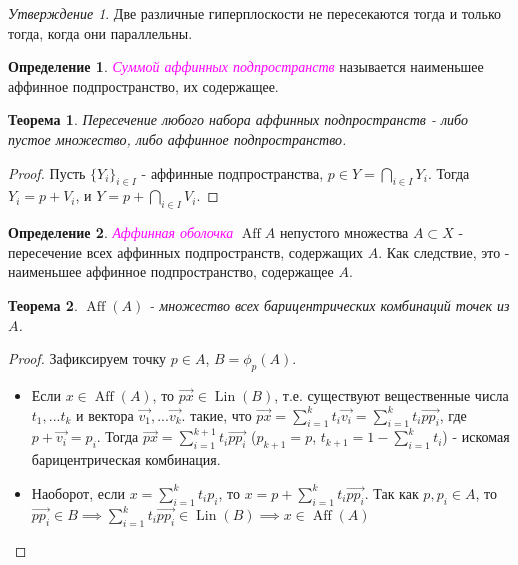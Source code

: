 \documentclass[a4paper,100pt]{article}
\theoremstyle{indented}
\newtheorem{theorem}{Теорема}
\theoremstyle{definition}
\newtheorem{defn}{Определение}
\theoremstyle{remark}
\newtheorem{stat}{Утверждение}
\DeclareMathOperator{\Aff}{Aff}
\DeclareMathOperator{\Lin}{Lin}
\begin{document}
\begin{stat}
    Две различные гиперплоскости не пересекаются тогда и только тогда, когда они параллельны.
\end{stat}

\begin{defn}
    \textit{\textcolor{magenta}{\hypertarget{s20}{Суммой аффинных подпространств}}} называется наименьшее аффинное подпространство, их содержащее.
\end{defn}

\begin{theorem}
    Пересечение любого набора аффинных подпространств - либо пустое множество, либо аффинное подпространство.
\end{theorem}

\begin{proof}
    Пусть $\{Y_i\}_{i \in I}$ - аффинные подпространства, $p \in Y=\bigcap_{i \in I} Y_i$. Тогда $Y_i=p+V_i$, и $Y=p+\bigcap_{i \in I}  V_i$. 
\end{proof}

\begin{defn}
    \textit{\textcolor{magenta}{\hypertarget{s21}{Аффинная оболочка}}} $\Aff{A}$ непустого множества $A\subset X$ - пересечение всех аффинных подпространств, содержащих $A$. Как следствие, это - наименьшее аффинное подпространство, содержащее $A$. 
\end{defn}

\begin{theorem}
    $\Aff(A)$ - множество всех барицентрических комбинаций точек из $A$. 
\end{theorem}

\begin{proof}
    Зафиксируем точку $p \in A$, $B=\phi_p(A)$. 
    \begin{itemize}
        \item Если $x \in \Aff(A)$, то $\vec{px} \in \Lin(B)$, т.е. существуют вещественные числа $t_1, ... t_k$ и вектора $\vec{v_1}, ... \vec{v_k}$. такие, что $\vec{px}=\sum_{i=1}^k t_i\vec{v_i}=\sum_{i=1}^k t_i\vec{pp_i}$, где $p+\vec{v_i}=p_i$. Тогда $\vec{px}=\sum_{i=1}^{k+1} t_i\vec{pp_i}$ ($p_{k+1}=p$, $t_{k+1}=1-\sum_{i=1}^k t_i$) - искомая барицентрическая комбинация.
        \item Наоборот, если $x=\sum_{i=1}^k t_i p_i$, то $x=p+\sum_{i=1}^k t_i\vec{pp_i}$. Так как $p, p_i \in A$, то $\vec{pp_i} \in B \implies \sum_{i=1}^k t_i\vec{pp_i} \in \Lin(B) \implies x \in \Aff(A)$
    \end{itemize}
\end{proof}
    
\end{document}

